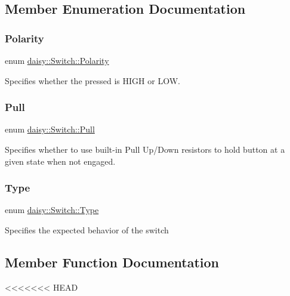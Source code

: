 \subsection{Member Enumeration Documentation}
\mbox{\label{classdaisy_1_1_switch_aef37136dd1b4cd077ef82a0f62bcfa3d}} 
\subsubsection{\texorpdfstring{Polarity}{Polarity}}
{\footnotesize\ttfamily enum \hyperlink{classdaisy_1_1_switch_aef37136dd1b4cd077ef82a0f62bcfa3d}{daisy\+::\+Switch\+::\+Polarity}}

Specifies whether the pressed is H\+I\+GH or L\+OW. \mbox{\label{classdaisy_1_1_switch_aa6c26cb923638a248a1d8d3cb1755e51}} 
\subsubsection{\texorpdfstring{Pull}{Pull}}
{\footnotesize\ttfamily enum \hyperlink{classdaisy_1_1_switch_aa6c26cb923638a248a1d8d3cb1755e51}{daisy\+::\+Switch\+::\+Pull}}

Specifies whether to use built-\/in Pull Up/\+Down resistors to hold button at a given state when not engaged. \mbox{\label{classdaisy_1_1_switch_a944058682bae079439ddddd42302b483}} 
\subsubsection{\texorpdfstring{Type}{Type}}
{\footnotesize\ttfamily enum \hyperlink{classdaisy_1_1_switch_a944058682bae079439ddddd42302b483}{daisy\+::\+Switch\+::\+Type}}

Specifies the expected behavior of the switch 

\subsection{Member Function Documentation}
<<<<<<< HEAD
\mbox{\label{classdaisy_1_1_switch_a564849b2de31395dda3cb464a65c5a24}} 
